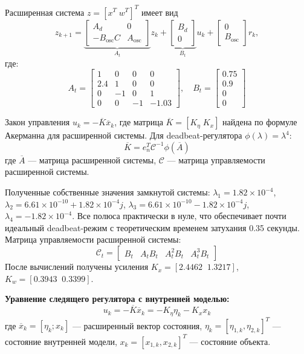 Расширенная система $z=[x^T\; w^T]^T$ имеет вид
\[
 z_{k+1}= \underbrace{\begin{bmatrix} A_d & 0\\ -B_{\text{osc}} C & A_{\text{osc}}\end{bmatrix}}_{A_t} z_k + \underbrace{\begin{bmatrix} B_d \\ 0 \end{bmatrix}}_{B_t} u_k + \begin{bmatrix}0\\ B_{\text{osc}}\end{bmatrix} r_k,
\]
где:
\[
A_t = \begin{bmatrix}
1 & 0 & 0 & 0\\
2.4 & 1 & 0 & 0\\
0 & -1 & 0 & 1\\
0 & 0 & -1 & -1.03
\end{bmatrix},\quad B_t = \begin{bmatrix}0.75\\ 0.9\\ 0\\ 0\end{bmatrix}
\]

Закон управления $u_k=-\overline{K} \overline{x}_k$, где матрица $\overline{K}=[K_\eta\;K_x]$ найдена по формуле Акерманна для расширенной системы. Для deadbeat-регулятора $\phi(\lambda)=\lambda^4$:
\[
\overline{K} = e_n^T \mathcal C^{-1} \phi(\overline{A})
\]
где $\overline{A}$ — матрица расширенной системы, $\mathcal C$ — матрица управляемости расширенной системы.

Полученные собственные значения замкнутой системы: $\lambda_1 = 1.82 \times 10^{-4}$, $\lambda_2 = 6.61 \times 10^{-10} + 1.82 \times 10^{-4}j$, $\lambda_3 = 6.61 \times 10^{-10} - 1.82 \times 10^{-4}j$, $\lambda_4 = -1.82 \times 10^{-4}$. Все полюса практически в нуле, что обеспечивает почти идеальный deadbeat-режим с теоретическим временем затухания 0.35 секунды.
Матрица управляемости расширенной системы:
\[
\mathcal C_t = \begin{bmatrix}B_t & A_t B_t & A_t^2 B_t & A_t^3 B_t\end{bmatrix}
\]
После вычислений получены усиления $K_x=[2.4462\;\;1.3217]$, $K_w=[0.3943\;\;0.3399]$.

\textbf{Уравнение следящего регулятора с внутренней моделью:}
\[
u_k = -\overline{K} \overline{x}_k = -K_\eta \eta_k - K_x x_k
\]
где $\overline{x}_k = [\eta_k; x_k]$ — расширенный вектор состояния, $\eta_k = [\eta_{1,k}, \eta_{2,k}]^T$ — состояние внутренней модели, $x_k = [x_{1,k}, x_{2,k}]^T$ — состояние объекта.

